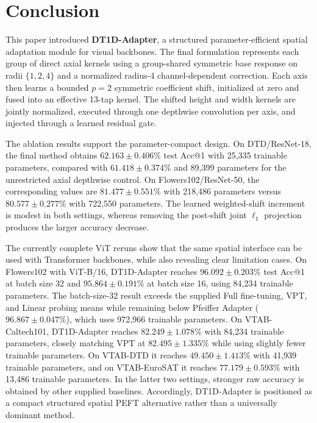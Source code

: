\documentclass[pdflatex,sn-mathphys-num]{sn-jnl}
\theoremstyle{thmstyleone}
\theoremstyle{thmstyletwo}
\theoremstyle{thmstylethree}
\begin{document}
\section{Conclusion}
\label{sec:Conclusion}

This paper introduced \textbf{DT1D-Adapter}, a structured parameter-efficient spatial adaptation module for visual backbones. The final formulation represents each group of direct axial kernels using a group-shared symmetric base response on radii $\{1,2,4\}$ and a normalized radius-4 channel-dependent correction. Each axis then learns a bounded $p=2$ symmetric coefficient shift, initialized at zero and fused into an effective 13-tap kernel. The shifted height and width kernels are jointly normalized, executed through one depthwise convolution per axis, and injected through a learned residual gate.

The ablation results support the parameter-compact design. On DTD/ResNet-18, the final method obtains $62.163\pm0.406\%$ test Acc@1 with 25,335 trainable parameters, compared with $61.418\pm0.374\%$ and 89,399 parameters for the unrestricted axial depthwise control. On Flowers102/ResNet-50, the corresponding values are $81.477\pm0.551\%$ with 218,486 parameters versus $80.577\pm0.277\%$ with 722,550 parameters. The learned weighted-shift increment is modest in both settings, whereas removing the post-shift joint $\ell_1$ projection produces the larger accuracy decrease.

The currently complete ViT reruns show that the same spatial interface can be used with Transformer backbones, while also revealing clear limitation cases. On Flowers102 with ViT-B/16, DT1D-Adapter reaches $96.092\pm0.203\%$ test Acc@1 at batch size 32 and $95.864\pm0.191\%$ at batch size 16, using 84,234 trainable parameters. The batch-size-32 result exceeds the supplied Full fine-tuning, VPT, and Linear probing means while remaining below Pfeiffer Adapter ($96.867\pm0.047\%$), which uses 972,966 trainable parameters. On VTAB-Caltech101, DT1D-Adapter reaches $82.249\pm1.078\%$ with 84,234 trainable parameters, closely matching VPT at $82.495\pm1.335\%$ while using slightly fewer trainable parameters. On VTAB-DTD it reaches $49.450\pm1.413\%$ with 41,939 trainable parameters, and on VTAB-EuroSAT it reaches $77.179\pm0.593\%$ with 13,486 trainable parameters. In the latter two settings, stronger raw accuracy is obtained by other supplied baselines. Accordingly, DT1D-Adapter is positioned as a compact structured spatial PEFT alternative rather than a universally dominant method.
\end{document}
